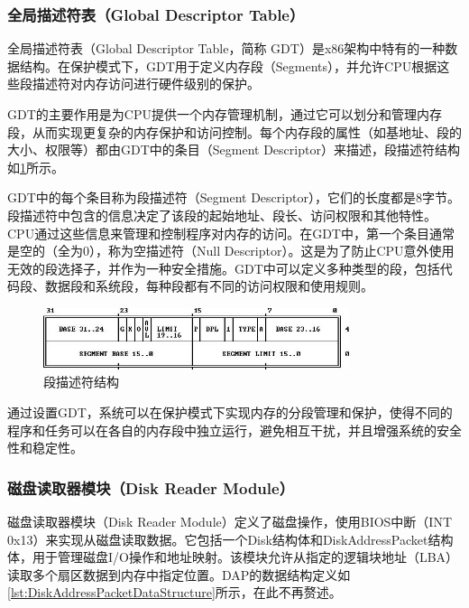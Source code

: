 \subsubsection{全局描述符表（Global Descriptor Table）}

全局描述符表（Global Descriptor Table，简称 GDT）是x86架构中特有的一种数据结构。在保护模式下，GDT用于定义内存段（Segments），并允许CPU根据这些段描述符对内存访问进行硬件级别的保护。

GDT的主要作用是为CPU提供一个内存管理机制，通过它可以划分和管理内存段，从而实现更复杂的内存保护和访问控制。每个内存段的属性（如基地址、段的大小、权限等）都由GDT中的条目（Segment Descriptor）来描述，段描述符结构如\cref{fig:SegmentDescriptorStructure}所示。

GDT中的每个条目称为段描述符（Segment Descriptor），它们的长度都是8字节。段描述符中包含的信息决定了该段的起始地址、段长、访问权限和其他特性。CPU通过这些信息来管理和控制程序对内存的访问。在GDT中，第一个条目通常是空的（全为0），称为空描述符（Null Descriptor）。这是为了防止CPU意外使用无效的段选择子，并作为一种安全措施。GDT中可以定义多种类型的段，包括代码段、数据段和系统段，每种段都有不同的访问权限和使用规则。

\begin{figure}[htbp]
    \centering
    \includegraphics[width=0.8\textwidth]{figures/SegmentDescriptorStructure.png}
    \caption{段描述符结构}
    \label{fig:SegmentDescriptorStructure}
\end{figure}

通过设置GDT，系统可以在保护模式下实现内存的分段管理和保护，使得不同的程序和任务可以在各自的内存段中独立运行，避免相互干扰，并且增强系统的安全性和稳定性。

\subsubsection{磁盘读取器模块（Disk Reader Module）}

磁盘读取器模块（Disk Reader Module）定义了磁盘操作，使用BIOS中断（INT 0x13）来实现从磁盘读取数据。它包括一个Disk结构体和DiskAddressPacket结构体，用于管理磁盘I/O操作和地址映射。该模块允许从指定的逻辑块地址（LBA）读取多个扇区数据到内存中指定位置。DAP的数据结构定义如\cref{lst:DiskAddressPacketDataStructure}所示，在此不再赘述。

